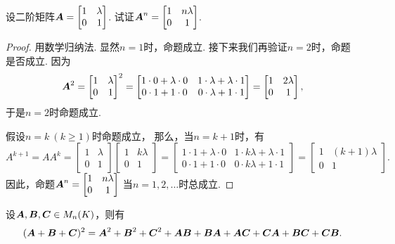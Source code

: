 \begin{example}
设二阶矩阵\(\boldsymbol{A}=\begin{bmatrix} 1 & \lambda \\ 0 & 1 \end{bmatrix}\).
试证\(\boldsymbol{A}^n=\begin{bmatrix} 1 & n\lambda \\ 0 & 1 \end{bmatrix}\).
\begin{proof}
用数学归纳法.
显然\(n=1\)时，命题成立.
接下来我们再验证\(n=2\)时，命题是否成立.
因为\[
	\boldsymbol{A}^2
	= \begin{bmatrix}
		1 & \lambda \\
		0 & 1
	\end{bmatrix}^2
	= \begin{bmatrix}
		1\cdot0+\lambda\cdot0 & 1\cdot\lambda+\lambda\cdot1 \\
		0\cdot1+1\cdot0 & 0\cdot\lambda+1\cdot1
	\end{bmatrix}
	= \begin{bmatrix}
		1 & 2\lambda \\
		0 & 1
	\end{bmatrix},
\]
于是\(n=2\)时命题成立.

假设\(n=k\ (k\geq1)\)时命题成立，
那么，当\(n=k+1\)时，有\[
	A^{k+1}
	= A A^k
	= \begin{bmatrix}
		1 & \lambda \\
		0 & 1
	\end{bmatrix}
	\begin{bmatrix}
		1 & k\lambda \\
		0 & 1
	\end{bmatrix}
	= \begin{bmatrix}
		1\cdot1+\lambda\cdot0 & 1\cdot k\lambda+\lambda\cdot1 \\
		0\cdot1+1\cdot0 & 0\cdot k\lambda+1\cdot1
	\end{bmatrix}
	= \begin{bmatrix}
		1 & (k+1)\lambda \\
		0 & 1
	\end{bmatrix}.
\]
因此，命题\(\boldsymbol{A}^n=\begin{bmatrix} 1 & n\lambda \\ 0 & 1 \end{bmatrix}\)
当\(n=1,2,\dotsc\)时总成立.
\end{proof}
\end{example}

\begin{example}
设\(\boldsymbol{A},\boldsymbol{B},\boldsymbol{C} \in M_n(K)\)，则有\[
	(\boldsymbol{A} + \boldsymbol{B} + \boldsymbol{C})^2
	= \boldsymbol{A}^2 + \boldsymbol{B}^2 + \boldsymbol{C}^2 + \boldsymbol{A}\boldsymbol{B} + \boldsymbol{B}\boldsymbol{A} + \boldsymbol{A}\boldsymbol{C} + \boldsymbol{C}\boldsymbol{A} + \boldsymbol{B}\boldsymbol{C} + \boldsymbol{C}\boldsymbol{B}.
\]
\end{example}

